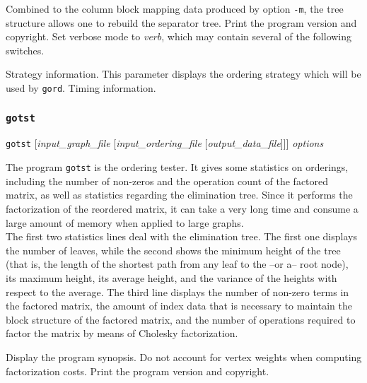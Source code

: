 \begin{itemize}
\begin{itemize}
Combined to the column block mapping data produced by option \texttt{-m},
the tree structure allows one to rebuild the separator tree.
\iteme[\texttt{-V}]
Print the program version and copyright.
Set verbose mode to {\it verb}, which may contain several of the following
switches.
\begin{itemize}
\iteme[\texttt{s}]
Strategy information. This parameter displays the ordering
strategy which will be used by \texttt{gord}.
\iteme[\texttt{t}]
Timing information.
\end{itemize}
\end{itemize}
\end{itemize}

\subsubsection{\texttt{gotst}}
\label{sec-prog-gotst}

\begin{itemize}
\progsyn
\texttt{gotst} [{\it input\_graph\_file} [{\it input\_ordering\_file} [{\it output\_data\_file}]]] {\it options}

\progdes
The program \texttt{gotst} is the ordering tester. It gives some
statistics on orderings, including the number of non-zeros and
the operation count of the factored matrix, as well as statistics
regarding the elimination tree. Since it performs the factorization
of the reordered matrix, it can take a very long time and consume
a large amount of memory when applied to large graphs.
\\
The first two statistics lines deal with the elimination tree. The
first one displays the number of leaves, while the second shows
the minimum height of the tree (that is, the
length of the shortest path from any leaf to the --or a-- root node),
its maximum height, its average height, and the variance of the
heights with respect to the average.
The third line displays the number of non-zero terms in the factored
matrix, the amount of index data that is necessary to maintain the
block structure of the factored matrix, and the number of operations
required to factor the matrix by means of Cholesky factorization.

\progopt
\begin{itemize}
\iteme[\texttt{-h}]
Display the program synopsis.
\iteme[\texttt{-v}]
Do not account for vertex weights when computing factorization costs.
\iteme[\texttt{-V}]
Print the program version and copyright.
\end{itemize}
\end{itemize}

